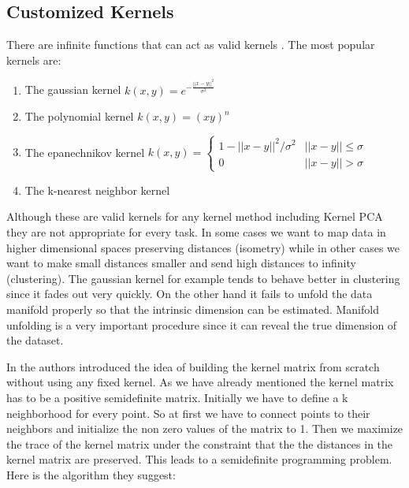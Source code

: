 \documentclass[12pt,letterpaper,doublespaced,ETD,dvips,proposal]{gtthesis}
\begin{document}
\begin{Body}
\subsection{Customized Kernels}
There are infinite functions
that can act as valid kernels \cite{shawetaylor2004kmp}. The most popular kernels are:
\begin{enumerate}
  \item The gaussian kernel $k(x, y)=e^{-\frac{||x-y||^2}{\sigma^2}}$
  \item The polynomial kernel $k(x, y)=(xy)^n$
  \item The epanechnikov kernel $k(x, y)=\left\{ \begin{array}{cc}
                                                  1-||x-y||^2/\sigma^2 & ||x-y||\leq\sigma \\
                                                  0                    & ||x-y||>\sigma 
                                                \end{array} \right.$
  \item The k-nearest neighbor kernel
\end{enumerate}

Although these are valid kernels for any kernel method including
Kernel PCA they are not appropriate for every task. In some cases we
want to map data in higher dimensional spaces preserving distances
(isometry) while in other cases we want to make small distances
smaller and send high distances to infinity (clustering). The
gaussian kernel for example tends to behave better in clustering
since it fades out very quickly. On the other hand it fails to
unfold the data manifold properly so that the intrinsic dimension
can be estimated. Manifold unfolding is a very important procedure
since it can reveal the true dimension of the dataset.

In \cite{weinberger2004lkm} the authors introduced the idea of building the kernel matrix
from scratch without using any fixed kernel. As we have already
mentioned the kernel matrix has to be a positive semidefinite
matrix. Initially we have to define a k neighborhood  for every
point. So at first we have to connect points to their neighbors and
 initialize the non zero values of the matrix to 1. Then we
maximize the trace of the kernel matrix under the constraint that
the the distances in the kernel matrix are preserved. This leads to
a semidefinite programming problem. Here is the algorithm they
suggest:

\vspace{1cm}


\end{Body}
\end{document}
